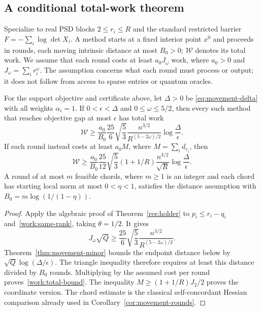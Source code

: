 \subsection{A conditional total-work theorem}
Specialize to real PSD blocks $2\leq r_i\leq R$ and the standard
restricted barrier $F=-\sum_i\log\det X_i$. A method starts at a fixed
interior point $x^0$ and proceeds in rounds, each moving intrinsic
distance at most $B_0>0$; $\mathcal W$ denotes its total work. We assume
that each round costs at least $a_0J_\omega$ work, where $a_0>0$ and
$J_\omega=\sum_i r_i^\omega$. The assumption concerns what each round
must process or output; it does not follow from access to
sparse entries or quantum oracles.

\begin{theorem}\label{work:total}
For the support objective and certificate above, let $\Delta>0$ be
\eqref{eq:movement-delta} with all weights $\alpha_i=1$. If
$0<\epsilon<\Delta$ and $0\leq\omega\leq5/2$, then every such method
that reaches objective gap at most $\epsilon$ has total work
\begin{equation}\label{work:total-bound}
 \mathcal W\geq\frac{a_0}{B_0}\frac{25}{6}\sqrt{\frac53}
 \frac{n^{3/2}}{R^{(5-2\omega)/2}}
 \log\frac{\Delta}{\epsilon}.
\end{equation}
If each round instead costs at least $a_0M$, where
$M=\sum_i d_{r_i}$, then
\begin{equation}\label{work:coordinate-total}
 \mathcal W\geq\frac{a_0}{B_0}\frac{25}{12}\sqrt{\frac53}
 (1+1/R)\frac{n^{3/2}}{\sqrt R}\log\frac{\Delta}{\epsilon}.
\end{equation}
A round of at most $m$ feasible chords, where $m\geq1$ is
an integer and each chord has starting local norm at most $0<\eta<1$,
satisfies the distance assumption with $B_0=m\log(1/(1-\eta))$.
\end{theorem}
\begin{proof}
Apply the algebraic proof of Theorem~\ref{res:holder} to
$p_i\leq r_i-q_i$ and~\eqref{work:same-rank}, taking $\theta=1/2$.
It gives
\[
 J_\omega\sqrt Q\geq\frac{25}{6}\sqrt{\frac53}
                    \frac{n^{3/2}}{R^{(5-2\omega)/2}}.
\]
Theorem~\ref{thm:movement-minor} bounds the endpoint distance below by
$\sqrt Q\log(\Delta/\epsilon)$. The triangle inequality therefore
requires at least this distance divided by $B_0$ rounds. Multiplying by
the assumed cost per round proves~\eqref{work:total-bound}.
The inequality $M\geq(1+1/R)J_2/2$ proves the coordinate version.
The chord estimate is the classical self-concordant Hessian comparison
already used in Corollary~\ref{cor:movement-rounds}.
\end{proof}

